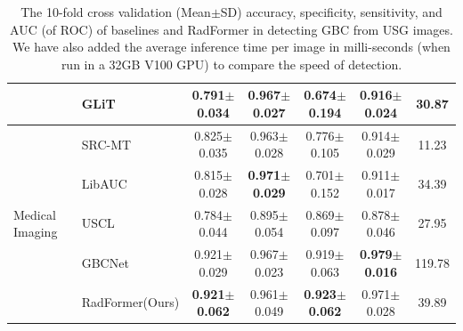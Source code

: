 \documentclass[twocolumn,final]{elsarticle}
\def\myarch{RadFormer\xspace}
\begin{document}
\begin{table}[!t]
{\begin{tabular}{llccccc}
		& GLiT \citep{chen2021glit} & 0.791$\pm$0.034 & 0.967$\pm$0.027 & 0.674$\pm$0.194 & 0.916$\pm$0.024 & 30.87 \\
		\midrule
		\multirow{5}{*}{Medical Imaging} &
		SRC-MT \citep{liu2020semi} & 0.825$\pm$0.035 & 0.963$\pm$0.028 & 0.776$\pm$0.105 & 0.914$\pm$0.029 & 11.23 \\
		& LibAUC \citep{yuan2021robust} & 0.815$\pm$0.028 & \textbf{0.971$\pm$0.029} & 0.701$\pm$0.152 & 0.911$\pm$0.017 & 34.39 \\
		& USCL \citep{chen2021uscl} & 0.784$\pm$0.044 & 0.895$\pm$0.054 & 0.869$\pm$0.097 & 0.878$\pm$0.046 & 27.95 \\
		& GBCNet \citep{basu2022surpassing} & 0.921$\pm$0.029 & 0.967$\pm$0.023 & 0.919$\pm$0.063 & \textbf{0.979$\pm$0.016} & 119.78 \\
		\midrule%
		& \myarch (Ours) & \textbf{0.921$\pm$0.062} & 0.961$\pm$0.049 & \textbf{0.923$\pm$0.062} & 0.971$\pm$0.028 & 39.89 \\
		\bottomrule
	\end{tabular}
	}
	\caption{The 10-fold cross validation (Mean$\pm$SD) accuracy, specificity, sensitivity, and AUC (of ROC) of baselines and \myarch in detecting GBC from USG images. We have also added the average inference time per image in milli-seconds (when run in a 32GB V100 GPU) to compare the speed of detection.}
	\label{tab:perf_dnns}
\end{table}
\end{document}

